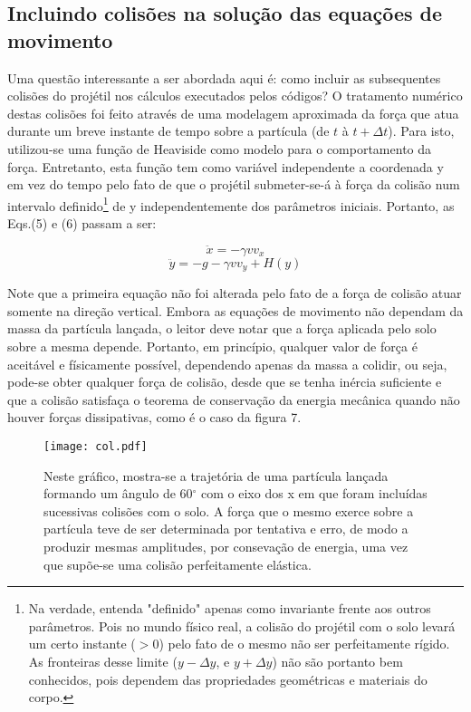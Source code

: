 \documentclass[a4paper, brazilian, 8pt, final]{article}
\begin{document}
\begin{multicols}{2}
\section{Incluindo colisões na solução das equações de movimento}
\quad Uma questão interessante a ser abordada aqui é: como incluir as subsequentes colisões do projétil nos cálculos executados pelos códigos? O tratamento numérico destas colisões foi feito através de uma modelagem aproximada da força que atua durante um breve instante de tempo sobre a partícula (de $t$ à $t + \Delta t$). Para isto, utilizou-se uma função de Heaviside como modelo para o comportamento da força. Entretanto, esta função tem como variável independente a coordenada y em vez do tempo pelo fato de que o projétil submeter-se-á à força da colisão num intervalo definido\footnote{Na verdade, entenda "definido" apenas como invariante frente aos outros parâmetros. Pois no mundo físico real, a colisão do projétil com o solo levará um certo instante ($> 0$) pelo fato de o mesmo não ser perfeitamente rígido. As fronteiras desse limite ($y-\Delta y$, e $y+\Delta y$) não são portanto bem conhecidos, pois dependem das propriedades geométricas e materiais do corpo.} de y independentemente dos parâmetros iniciais. Portanto, as Eqs.(5) e (6) passam a ser:

\begin{equation}
\ddot{x} = -\gamma vv_{x}
\end{equation}
\begin{equation}
\ddot{y} = -g-\gamma vv_{y} + H(y)
\end{equation}

\quad Note que a primeira equação não foi alterada pelo fato de a força de colisão atuar somente na direção vertical. Embora as equações de movimento não dependam da massa da partícula lançada, o leitor deve notar que a força aplicada pelo solo sobre a mesma depende. Portanto, em princípio, qualquer valor de força é aceitável e físicamente possível, dependendo apenas da massa a colidir, ou seja, pode-se obter qualquer força de colisão, desde que se tenha inércia suficiente e que a colisão satisfaça o teorema de conservação da energia mecânica quando não houver forças dissipativas, como é o caso da figura 7.
\end{multicols}

\begin{figure}
\centering
\texttt{[image: col.pdf]}
\caption{Neste gráfico, mostra-se a trajetória de uma partícula lançada formando um ângulo de 60$^{\circ}$ com o eixo dos x em que foram incluídas sucessivas colisões com o solo. A força que o mesmo exerce sobre a partícula teve de ser determinada por tentativa e erro, de modo a produzir mesmas amplitudes, por consevação de energia, uma vez que supõe-se uma colisão perfeitamente elástica.}
\end{figure}    
\end{document}
